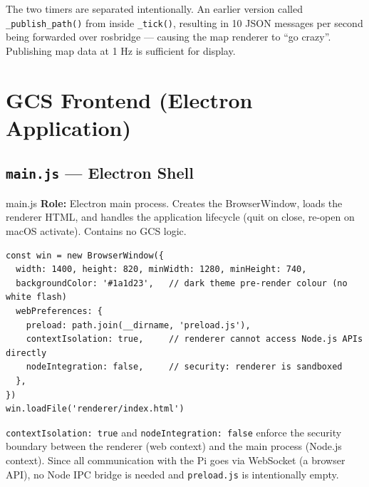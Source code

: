\documentclass[11pt,a4paper]{article}
\begin{document}
\begin{notebox}
The two timers are separated intentionally. An earlier version called
\texttt{\_publish\_path()} from inside \texttt{\_tick()}, resulting in 10 JSON
messages per second being forwarded over rosbridge — causing the map renderer
to ``go crazy''. Publishing map data at 1 Hz is sufficient for display.
\end{notebox}

\section{GCS Frontend (Electron Application)}

\subsection{\texttt{main.js} — Electron Shell}

\begin{filebox}{main.js}
\textbf{Role:} Electron main process. Creates the BrowserWindow, loads the
renderer HTML, and handles the application lifecycle (quit on close,
re-open on macOS activate). Contains no GCS logic.
\end{filebox}

\begin{lstlisting}[style=javascript, caption=BrowserWindow creation in main.js]
const win = new BrowserWindow({
  width: 1400, height: 820, minWidth: 1280, minHeight: 740,
  backgroundColor: '#1a1d23',   // dark theme pre-render colour (no white flash)
  webPreferences: {
    preload: path.join(__dirname, 'preload.js'),
    contextIsolation: true,     // renderer cannot access Node.js APIs directly
    nodeIntegration: false,     // security: renderer is sandboxed
  },
})
win.loadFile('renderer/index.html')
\end{lstlisting}

\texttt{contextIsolation: true} and \texttt{nodeIntegration: false} enforce
the security boundary between the renderer (web context) and the main process
(Node.js context). Since all communication with the Pi goes via WebSocket
(a browser API), no Node IPC bridge is needed and \texttt{preload.js} is
intentionally empty.
\end{document}
